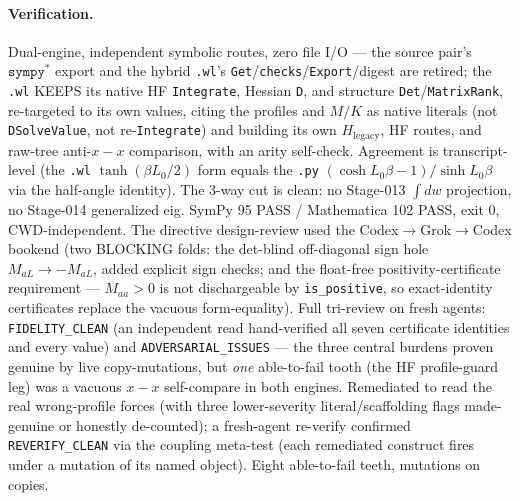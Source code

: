 \paragraph{Verification.}
Dual-engine, independent symbolic routes, zero file I/O --- the source pair's
\(\texttt{sympy}^\ast\) export and the hybrid \texttt{.wl}'s
\texttt{Get}/\texttt{checks}/\texttt{Export}/digest are retired; the \texttt{.wl}
KEEPS its native HF \texttt{Integrate}, Hessian \texttt{D}, and structure
\texttt{Det}/\texttt{MatrixRank}, re-targeted to its own values, citing the profiles
and \(M/K\) as native literals (not \texttt{DSolveValue}, not re-\texttt{Integrate})
and building its own \(H_{\mathrm{legacy}}\), HF routes, and raw-tree anti-\(x\!-\!x\)
comparison, with an arity self-check. Agreement is transcript-level (the \texttt{.wl}
\(\tanh(\beta L_0/2)\) form equals the \texttt{.py} \((\cosh L_0\beta-1)/\sinh
L_0\beta\) via the half-angle identity). The 3-way cut is clean: no Stage-013
\(\int dw\) projection, no Stage-014 generalized eig. SymPy 95 PASS /
Mathematica 102 PASS, exit 0, CWD-independent. The directive design-review used the
Codex\(\to\)Grok\(\to\)Codex bookend (two BLOCKING folds: the det-blind off-diagonal
sign hole \(M_{aL}\to-M_{aL}\), added explicit sign checks; and the float-free
positivity-certificate requirement --- \(M_{aa}>0\) is not dischargeable by
\texttt{is\_positive}, so exact-identity certificates replace the vacuous
form-equality). Full tri-review on fresh agents: \texttt{FIDELITY\_CLEAN} (an
independent read hand-verified all seven certificate identities and every value)
and \texttt{ADVERSARIAL\_ISSUES} --- the three central burdens proven genuine by
live copy-mutations, but \emph{one} able-to-fail tooth (the HF profile-guard leg)
was a vacuous \(x\!-\!x\) self-compare in both engines. Remediated to read the real
wrong-profile forces (with three lower-severity literal/scaffolding flags
made-genuine or honestly de-counted); a fresh-agent re-verify confirmed
\texttt{REVERIFY\_CLEAN} via the coupling meta-test (each remediated construct fires
under a mutation of its named object). Eight able-to-fail teeth, mutations on
copies.
